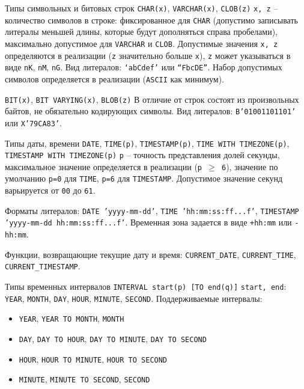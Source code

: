 \documentclass[a4paper,12pt]{article}
\begin{document}
Типы символьных и битовых строк  
\texttt{CHAR(x)}, \texttt{VARCHAR(x)}, \texttt{CLOB(z)}  
\texttt{x, z} – количество символов в строке: фиксированное для \texttt{CHAR} (допустимо записывать литералы меньшей длины, которые будут дополняться справа пробелами), максимально допустимое для \texttt{VARCHAR} и \texttt{CLOB}.  
Допустимые значения \texttt{x, z} определяются в реализации (\texttt{z} значительно больше \texttt{x}), \texttt{z} может указываться в виде \texttt{nK}, \texttt{nM}, \texttt{nG}.  
Вид литералов: \texttt{‘abCdef’} или \texttt{``FbcDE''}.  
Набор допустимых символов определяется в реализации (\texttt{ASCII} как минимум).

\texttt{BIT(x)}, \texttt{BIT VARYING(x)}, \texttt{BLOB(z)}  
В отличие от строк состоят из произвольных байтов, не обязательно кодирующих символы.  
Вид литералов: \texttt{B'01001101101'} или \texttt{X'79CA83'}.

Типы даты, времени  
\texttt{DATE}, \texttt{TIME(p)}, \texttt{TIMESTAMP(p)}, \texttt{TIME WITH TIMEZONE(p)}, \texttt{TIMESTAMP WITH TIMEZONE(p)}  
\texttt{p} – точность представления долей секунды, максимальное значение определяется в реализации (\texttt{p $\geq$ 6}), значение по умолчанию \texttt{p=0} для \texttt{TIME}, \texttt{p=6} для \texttt{TIMESTAMP}.  
Допустимое значение секунд варьируется от \texttt{00} до \texttt{61}.

Форматы литералов:  
\texttt{DATE 'yyyy-mm-dd'},  
\texttt{TIME 'hh:mm:ss:ff...f'},  
\texttt{TIMESTAMP 'yyyy-mm-dd hh:mm:ss:ff...f'}.  
Временная зона задается в виде \texttt{+hh:mm} или \texttt{-hh:mm}.

Функции, возвращающие текущие дату и время:  
\texttt{CURRENT\_DATE}, \texttt{CURRENT\_TIME}, \texttt{CURRENT\_TIMESTAMP}.

Типы временных интервалов  
\texttt{INTERVAL start(p) [TO end(q)]}  
\texttt{start, end}: \texttt{YEAR}, \texttt{MONTH}, \texttt{DAY}, \texttt{HOUR}, \texttt{MINUTE}, \texttt{SECOND}.  
Поддерживаемые интервалы:  
\begin{itemize}
    \item \texttt{YEAR}, \texttt{YEAR TO MONTH}, \texttt{MONTH}
    \item \texttt{DAY}, \texttt{DAY TO HOUR}, \texttt{DAY TO MINUTE}, \texttt{DAY TO SECOND}
    \item \texttt{HOUR}, \texttt{HOUR TO MINUTE}, \texttt{HOUR TO SECOND}
    \item \texttt{MINUTE}, \texttt{MINUTE TO SECOND}, \texttt{SECOND}
\end{itemize}
\end{document}
